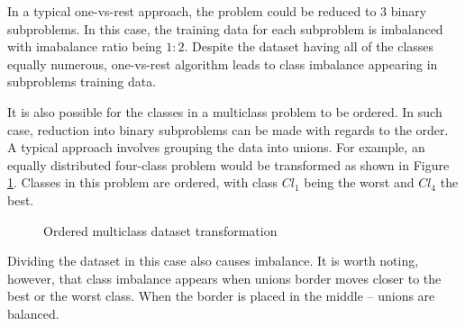\documentclass[12pt]{article}
\begin{document}
In a typical one-vs-rest approach, the problem could be reduced to $3$ binary subproblems. In this case, the training data for each subproblem is imbalanced with imabalance ratio being $1:2$. Despite the dataset having all of the classes equally numerous, one-vs-rest algorithm leads to class imbalance appearing in subproblems training data.

It is also possible for the classes in a multiclass problem to be ordered. In such case, reduction into binary subproblems can be made with regards to the order. A typical approach involves grouping the data into unions. For example, an equally distributed four-class problem would be transformed as shown in Figure \ref{img:balanced_ordered}. Classes in this problem are ordered, with class $Cl_1$ being the worst and $Cl_4$ the best.

\begin{figure}[H]
\centering
{}



\caption{Ordered multiclass dataset transformation}
\label{img:balanced_ordered}
\end{figure}

Dividing the dataset in this case also causes imbalance. It is worth noting, however, that class imbalance appears when unions border moves closer to the best or the worst class. When the border is placed in the middle -- unions are balanced.
\end{document}
